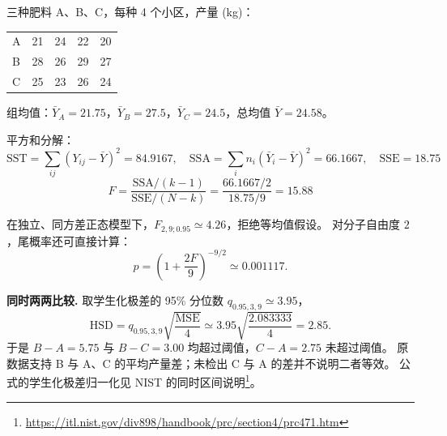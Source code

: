 \begin{exbox}[三种肥料产量比较]
三种肥料 A、B、C，每种 4 个小区，产量 (kg)：

\begin{center}
\begin{tabular}{lcccc}
\hline
A & 21 & 24 & 22 & 20 \\
B & 28 & 26 & 29 & 27 \\
C & 25 & 23 & 26 & 24 \\
\hline
\end{tabular}
\end{center}

组均值：$\bar Y_A=21.75$，$\bar Y_B=27.5$，$\bar Y_C=24.5$，总均值 $\bar Y=24.58$。

平方和分解：
\[
\mathrm{SST}=\sum_{ij}(Y_{ij}-\bar Y)^2=84.9167,\quad
\mathrm{SSA}=\sum_i n_i(\bar Y_i-\bar Y)^2=66.1667,\quad
\mathrm{SSE}=18.75
\]
\[
F=\frac{\mathrm{SSA}/(k-1)}{\mathrm{SSE}/(N-k)}=\frac{66.1667/2}{18.75/9}=15.88
\]

在独立、同方差正态模型下，$F_{2,9;0.95}\simeq4.26$，拒绝等均值假设。
对分子自由度 $2$，尾概率还可直接计算：
\[
 p=\left(1+\frac{2F}{9}\right)^{-9/2}\simeq0.001117.
\]



\textbf{同时两两比较.} 取学生化极差的 95\% 分位数 $q_{0.95,3,9}\simeq3.95$，
\[
 \mathrm{HSD}=q_{0.95,3,9}\sqrt{\frac{\mathrm{MSE}}4}
 \simeq3.95\sqrt{\frac{2.083333}4}=2.85.
\]
于是 $B-A=5.75$ 与 $B-C=3.00$ 均超过阈值，$C-A=2.75$ 未超过阈值。
原数据支持 B 与 A、C 的平均产量差；未检出 C 与 A 的差并不说明二者等效。
公式的学生化极差归一化见 NIST 的同时区间说明\footnote{\url{https://itl.nist.gov/div898/handbook/prc/section4/prc471.htm}}。

\end{exbox}
